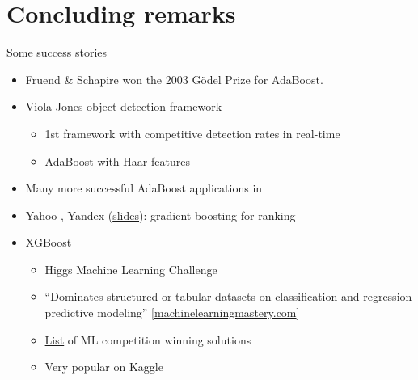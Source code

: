 \documentclass[handout]{beamer}
\begin{document}
\section{Concluding remarks}
\begin{frame}{Some success stories}
	\begin{itemize}[<+>]
	\item Fruend \& Schapire won the 2003 G\"{o}del Prize for AdaBoost.
		
	\item Viola-Jones object detection framework \cite{ViolaJones2001}
	\begin{itemize}[<.->]
		\item 1st framework with competitive detection rates in real-time
		\item AdaBoost with Haar features
	\end{itemize}

	\item Many more successful AdaBoost applications in \cite{FerrFigu2012}
	
	\item Yahoo \cite{CossockEtAl2008}, Yandex (\href{http://romip.ru/russir2009/slides/yandex/lecture.pdf}{slides}): gradient boosting for ranking
	
	\item XGBoost
	\begin{itemize}[<.->]
		\item Higgs Machine Learning Challenge \cite{ChenHe2015}
		
		\item ``Dominates structured or tabular datasets on classification and regression predictive modeling'' [\href{https://machinelearningmastery.com/gentle-introduction-xgboost-applied-machine-learning/}{machinelearningmastery.com}]
		
		\item \href{<https://github.com/dmlc/xgboost/tree/master/demo\#machine-learning-challenge-winning-solutions>}{List} of ML competition winning solutions
		
		\item Very popular on Kaggle
	\end{itemize}

	\end{itemize}
\end{frame}
\end{document}
